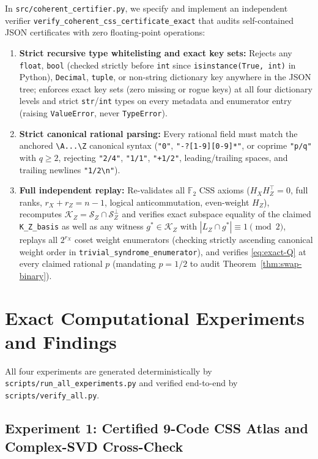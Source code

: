 \documentclass[11pt,a4paper]{article}
\theoremstyle{plain}
\theoremstyle{definition}
\newcommand{\Ftwo}{\mathbb{F}_2}
\newcommand{\SZ}{\mathcal{S}_Z}
\newcommand{\KZ}{\mathcal{K}_Z}
\begin{document}
In \texttt{src/coherent\_certifier.py}, we specify and implement an independent verifier \texttt{verify\_\allowbreak coherent\_\allowbreak css\_\allowbreak certificate\_\allowbreak exact} that audits self-contained JSON certificates with zero floating-point operations:
\begin{enumerate}[leftmargin=1.5em,itemsep=2pt]
  \item \textbf{Strict recursive type whitelisting and exact key sets:} Rejects any \texttt{float}, \texttt{bool} (checked strictly before \texttt{int} since \texttt{isinstance(True, int)} in Python), \texttt{Decimal}, \texttt{tuple}, or non-string dictionary key anywhere in the JSON tree; enforces exact key sets (zero missing or rogue keys) at all four dictionary levels and strict \texttt{str}/\texttt{int} types on every metadata and enumerator entry (raising \texttt{ValueError}, never \texttt{TypeError}).
  \item \textbf{Strict canonical rational parsing:} Every rational field must match the anchored \texttt{\textbackslash A...\textbackslash Z} canonical syntax (\texttt{"0"}, \texttt{"-?[1-9][0-9]*"}, or coprime \texttt{"p/q"} with $q \ge 2$, rejecting \texttt{"2/4"}, \texttt{"1/1"}, \texttt{"+1/2"}, leading/trailing spaces, and trailing newlines \texttt{"1/2\textbackslash n"}).
  \item \textbf{Full independent replay:} Re-validates all $\Ftwo$ CSS axioms ($H_X H_Z^\top = 0$, full ranks, $r_X + r_Z = n - 1$, logical anticommutation, even-weight $H_Z$), recomputes $\KZ = \SZ \cap \SZ^\perp$ and verifies exact subspace equality of the claimed \texttt{K\_Z\_basis} as well as any witness $g^* \in \KZ$ with $|L_Z \cap g^*| \equiv 1 \pmod 2$, replays all $2^{r_X}$ coset weight enumerators (checking strictly ascending canonical weight order in \texttt{trivial\_syndrome\_enumerator}), and verifies \eqref{eq:exact-Q} at every claimed rational $p$ (mandating $p = 1/2$ to audit Theorem~\ref{thm:swap-binary}).
\end{enumerate}

\section{Exact Computational Experiments and Findings}
\label{sec:experiments}

All four experiments are generated deterministically by \texttt{scripts/run\_all\_experiments.py} and verified end-to-end by \texttt{scripts/verify\_all.py}.

\subsection{Experiment 1: Certified 9-Code CSS Atlas and Complex-SVD Cross-Check}
\end{document}
